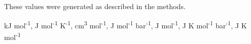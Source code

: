 \begin{landscape}
\begin{table}
\begin{adjustbox}{width=600pt,keepaspectratio}
\begin{threeparttable}
  \begin{tablenotes}
    These values were generated as described in the methods.
    
     kJ mol\textsuperscript{-1},
     J mol\textsuperscript{-1} K\textsuperscript{-1},
     cm\textsuperscript{3} mol\textsuperscript{-1},
     J mol\textsuperscript{-1} bar\textsuperscript{-1},
     J mol\textsuperscript{-1},
     J K mol\textsuperscript{-1} bar\textsuperscript{-1},
     J K mol\textsuperscript{-1}


  \end{tablenotes}
  
  \label{tab:BHP_thermo_props}
  \end{threeparttable}
  \end{adjustbox}
\end{table}

\doublespace
\end{landscape}
\setcounter{tabcounter}{0} %




